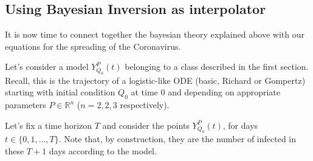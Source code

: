 \documentclass[9pt]{article}
\begin{document}

\subsection {Using Bayesian Inversion as interpolator}
It is now time to connect together the bayesian theory explained above
with our equations for the spreading of the Coronavirus.

Let's consider a model $Y_{Q_0}^P(t)$ belonging to a class
described in the first section. 
Recall, this is the trajectory of a 
logistic-like ODE (basic, Richard or Gompertz)
starting with initial condition $Q_0$ at time $0$ and depending on
appropriate parameters $P \in \mathbb{R}^n$ ($n = 2, 2, 3$ respectively).


Let's fix a time horizon $T$ and consider
the points $Y_{Q_0}^P(t)$, for days $t \in \{0, 1, \dots, T\}$.
Note that, by construction, they are  
the number of infected in these $T+1$ days according to the model.
\end{document}
